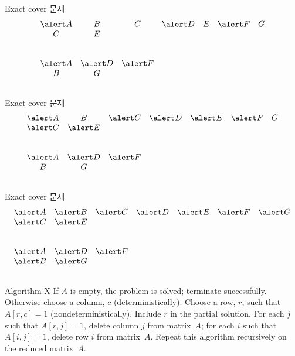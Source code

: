\documentclass{beamer}
\begin{document}
%
\begin{frame}{Exact cover 문제} 
  $$
  \begin{array}{ccccccc}
    \alert A & B & C & \alert D & E & \alert F & G\\
    C & E &&&&&\\
    &&&&&&\\
    &&&&&&\\
    \alert A & \alert D & \alert F &&&&\\
    B & G &&&&&\\
    &&&&&&
  \end{array}
  $$
\end{frame}

%
\begin{frame}{Exact cover 문제} 
  $$
  \begin{array}{ccccccc}
    \alert A & B & \alert C & \alert D & \alert E & \alert F & G\\
    \alert C & \alert E &&&&&\\
    &&&&&&\\
    &&&&&&\\
    \alert A & \alert D & \alert F &&&&\\
    B & G &&&&&\\
    &&&&&&
  \end{array}
  $$
\end{frame}

%
\begin{frame}{Exact cover 문제} 
  $$
  \begin{array}{ccccccc}
    \alert A & \alert B & \alert C & \alert D & \alert E & \alert F & \alert G\\
    \alert C & \alert E &&&&&\\
    &&&&&&\\
    &&&&&&\\
    \alert A & \alert D & \alert F &&&&\\
    \alert B & \alert G &&&&&\\
    &&&&&&
  \end{array}
  $$
\end{frame}

%
\begin{frame}[fragile]{Algorithm X}
  \begingroup\obeylines
  \baselineskip10pt
If $A$ is empty, the problem is solved; terminate successfully.
Otherwise choose a column, $c$ (deterministically).
Choose a row, $r$, such that $A[r,c]=1$ (nondeterministically).
Include $r$ in the partial solution.
For each $j$ such that $A[r,j]=1$,
\qquad delete column $j$ from matrix~$A$;
\qquad for each $i$ such that $A[i,j]=1$,
\qquad\qquad delete row $i$ from matrix~$A$.
Repeat this algorithm recursively on the reduced matrix~$A$.
\endgroup
\end{frame}
\end{document}
